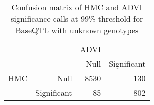\begin{table}[ht]
\centering
\caption{Confusion matrix of HMC and ADVI significance calls at 99\% threshold for BaseQTL with unknown genotypes} 
\label{tab:noGT-xtab-99}
\begin{tabular}{rr|rr}
   &  & ADVI &  \\ 
    &   & Null & Significant \\ 
   \hline
HMC & Null & 8530 & 130 \\ 
    & Significant & 85 & 802 \\ 
  \end{tabular}
\end{table}
